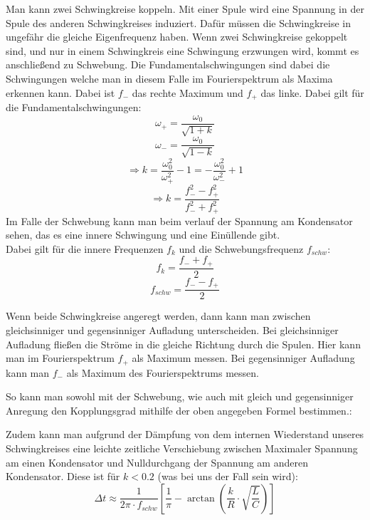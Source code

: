 \documentclass[twoside]{protokoll}
\begin{document}
Man kann zwei Schwingkreise koppeln. Mit einer Spule wird eine Spannung in der Spule des anderen Schwingkreises induziert.
Dafür müssen die Schwingkreise in ungefähr die gleiche Eigenfrequenz haben.
Wenn zwei Schwingkreise gekoppelt sind, und nur in einem Schwingkreis eine Schwingung erzwungen wird, kommt es anschließend zu Schwebung.
Die Fundamentalschwingungen sind dabei die Schwingungen welche man in diesem Falle im Fourierspektrum als Maxima erkennen kann.
Dabei ist $f_-$ das rechte Maximum und $f_+$ das linke.
Dabei gilt für die Fundamentalschwingungen:
\begin{equation}
    \omega_+ = \frac{\omega_0}{\sqrt{1 + k}}
\end{equation}
\begin{equation}
    \omega_- = \frac{\omega_0}{\sqrt{1 - k}}
\end{equation}
\begin{equation}
    \Rightarrow k = \frac{\omega_0^2}{\omega_+^2} - 1 = - \frac{\omega_0^2}{\omega_-^2} + 1
\end{equation}
\begin{equation}
    \Rightarrow k = \frac{f_-^2 - f_+^2}{f_-^2 + f_+^2}
\end{equation}
Im Falle der Schwebung kann man beim verlauf der Spannung am Kondensator sehen, das es eine innere Schwingung und eine Einüllende gibt. \\
Dabei gilt für die innere Frequenzen $f_k$ und die Schwebungsfrequenz $f_{schw}$:
\begin{equation}
    f_k = \frac{f_- + f_+}{2}
\end{equation}
\begin{equation}
    f_{schw} = \frac{f_- - f_+}{2}
\end{equation}
    

Wenn beide Schwingkreise angeregt werden, dann kann man zwischen gleichsinniger und gegensinniger Aufladung unterscheiden.
Bei gleichsinniger Aufladung fließen die Ströme in die gleiche Richtung durch die Spulen.
Hier kann man im Fourierspektrum $f_+$ als Maximum messen.
Bei gegensinniger Aufladung kann man $f_-$ als Maximum des Fourierspektrums messen.

So kann man sowohl mit der Schwebung, wie auch mit gleich und gegensinniger Anregung den Kopplungsgrad mithilfe der oben angegeben Formel bestimmen.:

Zudem kann man aufgrund der Dämpfung von dem internen Wiederstand unseres Schwingkreises eine leichte zeitliche Verschiebung zwischen Maximaler Spannung am einen Kondensator und Nulldurchgang der Spannung am anderen Kondensator.
Diese ist für $ k < 0.2$ (was bei uns der Fall sein wird):
\begin{equation}
    \Delta t \approx \frac{1}{2 \pi \cdot f_{schw}} \left[ \frac{1}{\pi} - \arctan{\left( \frac{k}{R} \cdot \sqrt{\frac{L}{C}} \right)} \right]
   \label{DeltaT}
\end{equation}
\end{document}
